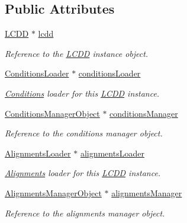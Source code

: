 \subsection*{Public Attributes}
\begin{DoxyCompactItemize}
\item 
\hyperlink{class_d_d4hep_1_1_geometry_1_1_l_c_d_d}{L\+C\+DD} $\ast$ \hyperlink{class_d_d4hep_1_1_geometry_1_1_world_object_a72d88491949f298897e034e2e5bc74df}{lcdd}
\begin{DoxyCompactList}\small\item\em Reference to the \hyperlink{class_d_d4hep_1_1_geometry_1_1_l_c_d_d}{L\+C\+DD} instance object. \end{DoxyCompactList}\item 
\hyperlink{class_d_d4hep_1_1_geometry_1_1_world_object_ab3186f89db27a386504504645203d688}{Conditions\+Loader} $\ast$ \hyperlink{class_d_d4hep_1_1_geometry_1_1_world_object_a9c6db420466092543b90e99e38a2727c}{conditions\+Loader}
\begin{DoxyCompactList}\small\item\em \hyperlink{namespace_d_d4hep_1_1_conditions}{Conditions} loader for this \hyperlink{class_d_d4hep_1_1_geometry_1_1_l_c_d_d}{L\+C\+DD} instance. \end{DoxyCompactList}\item 
\hyperlink{class_d_d4hep_1_1_geometry_1_1_world_object_a96576e6e392fe72924c1135cc8907aec}{Conditions\+Manager\+Object} $\ast$ \hyperlink{class_d_d4hep_1_1_geometry_1_1_world_object_a325a757896034d63270e1decfc883b8b}{conditions\+Manager}
\begin{DoxyCompactList}\small\item\em Reference to the conditions manager object. \end{DoxyCompactList}\item 
\hyperlink{class_d_d4hep_1_1_geometry_1_1_world_object_a30113114fd4d57fb10e2c39c484813c3}{Alignments\+Loader} $\ast$ \hyperlink{class_d_d4hep_1_1_geometry_1_1_world_object_ad14e95056a1b64557678f283364098fa}{alignments\+Loader}
\begin{DoxyCompactList}\small\item\em \hyperlink{namespace_d_d4hep_1_1_alignments}{Alignments} loader for this \hyperlink{class_d_d4hep_1_1_geometry_1_1_l_c_d_d}{L\+C\+DD} instance. \end{DoxyCompactList}\item 
\hyperlink{class_d_d4hep_1_1_geometry_1_1_world_object_ac5c3ed360e547df41b814ee0c5fddf9f}{Alignments\+Manager\+Object} $\ast$ \hyperlink{class_d_d4hep_1_1_geometry_1_1_world_object_a4cd3b67817855becace65515c1df4240}{alignments\+Manager}
\begin{DoxyCompactList}\small\item\em Reference to the alignments manager object. \end{DoxyCompactList}\end{DoxyCompactItemize}
